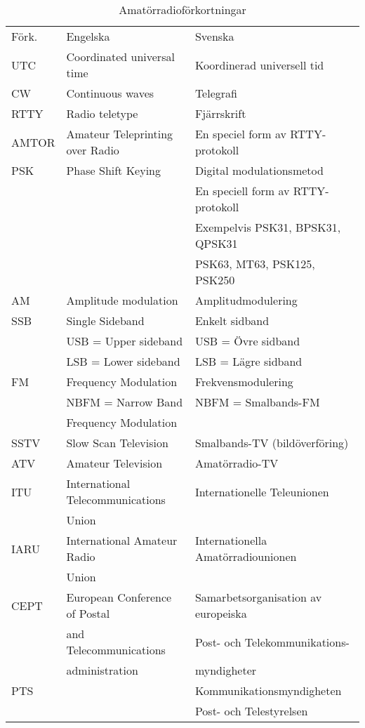 \begin{table*}[h]
  \begin{tabular}{lll}
    Förk. & Engelska & Svenska\\
    UTC & Coordinated universal time & Koordinerad universell tid\\
    CW & Continuous waves & Telegrafi\\
    RTTY & Radio teletype & Fjärrskrift\\
    AMTOR & Amateur Teleprinting over Radio & En speciel form av
    RTTY-protokoll\\
    PSK & Phase Shift Keying & Digital modulationsmetod\\
    && En speciell form av RTTY-protokoll\\
    && Exempelvis PSK31, BPSK31, QPSK31\\
    && PSK63, MT63, PSK125, PSK250\\
    AM & Amplitude modulation & Amplitudmodulering\\
    SSB & Single Sideband & Enkelt sidband\\
    & USB = Upper sideband & USB = Övre sidband\\
    & LSB = Lower sideband & LSB = Lägre sidband\\
    FM & Frequency Modulation & Frekvensmodulering\\
    & NBFM = Narrow Band & NBFM = Smalbands-FM\\
    & Frequency Modulation & \\
    SSTV & Slow Scan Television & Smalbands-TV (bildöverföring)\\
    ATV & Amateur Television & Amatörradio-TV\\
    ITU & International Telecommunications & Internationelle
    Teleunionen\\
    & Union & \\
    IARU & International Amateur Radio & Internationella
    Amatörradiounionen\\
    & Union &\\
    CEPT & European Conference of Postal & Samarbetsorganisation av europeiska\\
    & and Telecommunications & Post- och Telekommunikations-\\
    & administration & myndigheter\\
    PTS & & Kommunikationsmyndigheten\\
    && Post- och Telestyrelsen\\
  \end{tabular}
  \caption{Amatörradioförkortningar}
  \label{tab:amatorradioforkortningar}
\end{table*}

